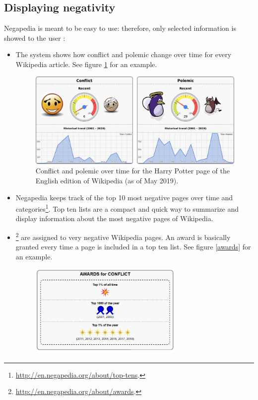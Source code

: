         \subsection{Displaying negativity}
            Negapedia is meant to be easy to use: therefore, only selected information is showed to the user \cite{MarchioriNegapedia}:
            \begin{itemize}
                \item The system shows how conflict and polemic change over time for every Wikipedia article. See figure \ref{conflict_polemic} for an example. 
                \begin{figure}
                    \centering
                    \includegraphics[width=\textwidth]{images/conflict-polemic.png}
                    \caption{Conflict and polemic over time for the Harry Potter page of the English edition of Wikipedia (as of May 2019).}
                    \label{conflict_polemic}
                \end{figure}
                \item Negapedia keeps track of the top 10 most negative pages over time and categories\footnote{\url{http://en.negapedia.org/about/top-tens}.}. Top ten lists are a compact and quick way to summarize and display information about the most negative pages of Wikipedia.
                \item {}\footnote{\url{http://en.negapedia.org/about/awards}.} are assigned to very negative Wikipedia pages. An award is basically granted every time a page is included in a top ten list. See figure \ref{awards} for an example.
                \begin{figure}
                    \centering
                    \includegraphics[width=0.7\textwidth]{images/awards.png}

\end{figure}
\end{itemize}
